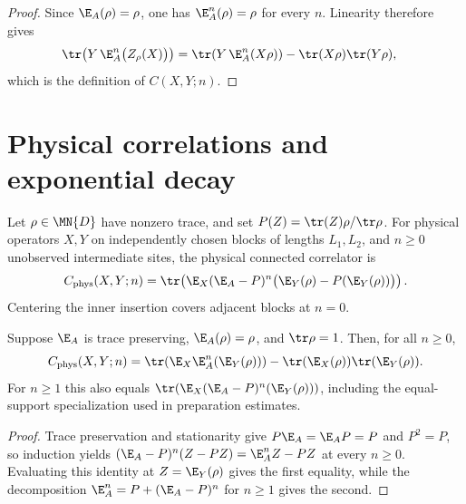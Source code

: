 \begin{proof}
    \leanok
    Since $\E_A(\rho)=\rho$, one has $\E_A^n(\rho)=\rho$ for every $n$.
    Linearity therefore gives
    \begin{align}
        \tr\!\left(Y\,\E_A^n\bigl(Z_\rho(X)\bigr)\right)
         & =
        \tr\!\left(Y\,\E_A^n(X\rho)\right)
        -\tr(X\rho)\tr(Y\rho),
    \end{align}
    which is the definition of $C(X,Y;n)$.
\end{proof}

\section{Physical correlations and exponential decay}

\begin{definition}
    \label{def:physical_connected_correlator}
    \leanok
    Let $\rho\in\MN{D}$ have nonzero trace, and set
    $P(Z)=\tr(Z)\rho/\tr\rho$. For physical operators $X,Y$ on independently
    chosen blocks of lengths $L_1,L_2$, and $n\geq0$ unobserved intermediate
    sites, the physical connected correlator is
    \[
        C_{\mathrm{phys}}(X,Y;n)=
        \tr\!\left(\E_X(\E_A-P)^n
        \bigl(\E_Y(\rho)-P(\E_Y(\rho))\bigr)\right).
    \]
    Centering the inner insertion covers adjacent blocks at $n=0$.
\end{definition}

\begin{lemma}
    \label{lem:physical_connected_correlator_identity}
    \leanok
    Suppose $\E_A$ is trace preserving, $\E_A(\rho)=\rho$, and $\tr\rho=1$.
    Then, for all $n\geq0$,
    \[
        C_{\mathrm{phys}}(X,Y;n)=
        \tr\!\left(\E_X\E_A^n(\E_Y(\rho))\right)
        -\tr(\E_X(\rho))\tr(\E_Y(\rho)).
    \]
    For $n\geq1$ this also equals
    $\tr(\E_X(\E_A-P)^n(\E_Y(\rho)))$, including the equal-support
    specialization used in preparation estimates.
\end{lemma}
\begin{proof}
    \leanok
    Trace preservation and stationarity give $P\E_A=\E_AP=P$ and $P^2=P$, so
    induction yields
    $(\E_A-P)^n(Z-PZ)=\E_A^nZ-PZ$ at every $n\geq0$.
    Evaluating this identity at $Z=\E_Y(\rho)$ gives the first equality, while
    the decomposition $\E_A^n=P+(\E_A-P)^n$ for $n\geq1$ gives the second.
\end{proof}

